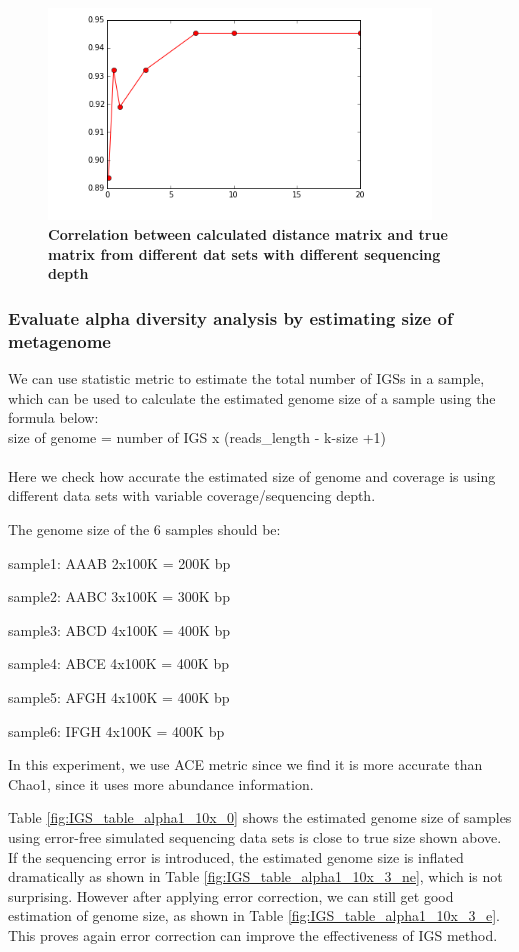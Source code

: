 \begin{figure}[!ht]
 \centerline{\includegraphics[width=4in]{./figures/IGS_correlation_coverage.png}}
\caption{\bf Correlation between calculated distance matrix and true matrix from different dat sets with different sequencing depth}
\label{fig:IGS_correlation_coverage}
\end{figure}


\subsubsection{Evaluate alpha diversity analysis by estimating size of metagenome}

We can use statistic metric to estimate the total number of IGSs in a sample, which can be used to calculate the estimated genome size of a sample using the formula below:
\\
size of genome = number of IGS x (reads\_length - k-size +1)\\
\\
Here we check how accurate the estimated size of genome and coverage is using different data sets with variable coverage/sequencing depth.

The genome size of the 6 samples should be:

sample1: AAAB 2x100K = 200K bp

sample2: AABC 3x100K = 300K bp

sample3: ABCD 4x100K = 400K bp

sample4: ABCE 4x100K = 400K bp

sample5: AFGH 4x100K = 400K bp

sample6: IFGH 4x100K = 400K bp

In this experiment, we use ACE metric since we find it is more accurate than Chao1, since it uses more abundance information.

Table \ref{fig:IGS_table_alpha1_10x_0} shows the estimated genome size of samples using error-free simulated sequencing data sets
is close to true size shown above. If the sequencing error is introduced, the estimated genome size is inflated dramatically as shown in Table \ref{fig:IGS_table_alpha1_10x_3_ne}, which is 
not surprising. However after applying error correction, we can still get good estimation of genome size, as shown in Table \ref{fig:IGS_table_alpha1_10x_3_e}.
This proves again error correction can improve the effectiveness of IGS method.

